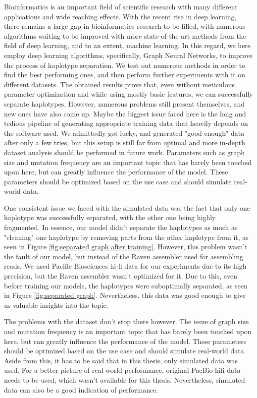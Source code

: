 \documentclass[times, utf8, diplomski, english]{fer_eng}
\begin{document}
Bioinformatics is an important field of scientific research with many different applications and wide reaching effects. With the recent rise in deep learning, there remains a large gap in bioinformatics research to be filled, with numerous algorithms waiting to be improved with more state-of-the art methods from the field of deep learning, and to an extent, machine learning. In this regard, we here employ deep learning algorithms, specifically, Graph Neural Networks, to improve the process of haplotype separation. We test out numerous methods in order to find the best performing ones, and then perform further experiments with it on different datasets. The obtained results prove that, even without meticulous parameter optimization and while using mostly basic features, we can successfully separate haplotypes. However, numerous problems still present themselves, and new ones have also come up. Maybe the biggest issue faced here is the long and tedious pipeline of generating appropriate training data that heavily depends on the software used. We admittedly got lucky, and generated "good enough" data after only a few tries, but this setup is still far from optimal and more in-depth dataset analysis should be performed in future work. Parameters such as graph size and mutation frequency are an important topic that has barely been touched upon here, but can greatly influence the performance of the model. These parameters should be optimized based on the use case and should simulate real-world data.

One consistent issue we faced with the simulated data was the fact that only one haplotype was successfully separated, with the other one being highly fragmented. In essence, our model didn't separate the haplotypes as much as "cleaning" one haplotype by removing parts from the other haplotype from it, as seen in Figure \ref{fig:separated graph after training}. However, this problem wasn't the fault of our model, but instead of the Raven assembler used for assembling reads. We used Pacific Biosciences hi-fi data for our experiments due to its high precision, but the Raven assembler wasn't optimized for it. Due to this, even before training our models, the haplotypes were suboptimally separated, as seen in Figure \ref{fig:separated graph}. Nevertheless, this data was good enough to give us valuable insights into the topic.

The problems with the dataset don't stop there however. The issue of graph size and mutation frequency is an important topic that has barely been touched upon here, but can greatly influence the performance of the model. These parameters should be optimized based on the use case and should simulate real-world data. Aside from this, it has to be said that in this thesis, only simulated data was used. For a better picture of real-world performance, original PacBio hifi data needs to be used, which wasn't available for this thesis. Nevertheless, simulated data can also be a good indication of performance.
\end{document}
